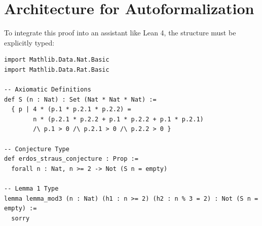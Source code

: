 \documentclass[12pt]{article}
\begin{document}
\section{Architecture for Autoformalization}
To integrate this proof into an assistant like Lean 4, the structure must be explicitly typed:

\begin{verbatim}
import Mathlib.Data.Nat.Basic
import Mathlib.Data.Rat.Basic

-- Axiomatic Definitions
def S (n : Nat) : Set (Nat * Nat * Nat) :=
  { p | 4 * (p.1 * p.2.1 * p.2.2) =
        n * (p.2.1 * p.2.2 + p.1 * p.2.2 + p.1 * p.2.1)
        /\ p.1 > 0 /\ p.2.1 > 0 /\ p.2.2 > 0 }

-- Conjecture Type
def erdos_straus_conjecture : Prop :=
  forall n : Nat, n >= 2 -> Not (S n = empty)

-- Lemma 1 Type
lemma lemma_mod3 (n : Nat) (h1 : n >= 2) (h2 : n % 3 = 2) : Not (S n = empty) :=
  sorry
\end{verbatim}
\end{document}
